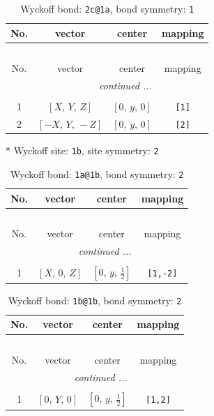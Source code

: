 \documentclass[fleqn,8pt]{jsarticle}
\begin{document}
\renewcommand{\arraystretch}{1.2}
\begin{longtable}{cccc}
\caption{Wyckoff bond: {\tt 2c@1a}, bond symmetry: {\tt 1}}
 \\
 \hline \hline
No. & vector & center & mapping \\ \hline \endfirsthead

\multicolumn{3}{l}{\tablename\ \thetable{}} \\
 \hline \hline
No. & vector & center & mapping \\ \hline \endhead

 \hline \hline
\multicolumn{3}{r}{\footnotesize\it continued ...} \\ \endfoot

 \hline \hline
\multicolumn{3}{r}{} \\ \endlastfoot

1 & $\left[ X,\, Y,\, Z \right]$ & $\left[ 0,\, y,\, 0 \right]$ & {\tt [1]} \\ \hline
2 & $\left[ - X,\, Y,\, - Z \right]$ & $\left[ 0,\, y,\, 0 \right]$ & {\tt [2]} \\
\end{longtable}
* Wyckoff site: {\tt 1b}, site symmetry: {\tt 2}
\renewcommand{\arraystretch}{1.2}
\begin{longtable}{cccc}
\caption{Wyckoff bond: {\tt 1a@1b}, bond symmetry: {\tt 2}}
 \\
 \hline \hline
No. & vector & center & mapping \\ \hline \endfirsthead

\multicolumn{3}{l}{\tablename\ \thetable{}} \\
 \hline \hline
No. & vector & center & mapping \\ \hline \endhead

 \hline \hline
\multicolumn{3}{r}{\footnotesize\it continued ...} \\ \endfoot

 \hline \hline
\multicolumn{3}{r}{} \\ \endlastfoot

1 & $\left[ X,\, 0,\, Z \right]$ & $\left[ 0,\, y,\, \frac{1}{2} \right]$ & {\tt [1,-2]} \\
\end{longtable}
\renewcommand{\arraystretch}{1.2}
\begin{longtable}{cccc}
\caption{Wyckoff bond: {\tt 1b@1b}, bond symmetry: {\tt 2}}
 \\
 \hline \hline
No. & vector & center & mapping \\ \hline \endfirsthead

\multicolumn{3}{l}{\tablename\ \thetable{}} \\
 \hline \hline
No. & vector & center & mapping \\ \hline \endhead

 \hline \hline
\multicolumn{3}{r}{\footnotesize\it continued ...} \\ \endfoot

 \hline \hline
\multicolumn{3}{r}{} \\ \endlastfoot

1 & $\left[ 0,\, Y,\, 0 \right]$ & $\left[ 0,\, y,\, \frac{1}{2} \right]$ & {\tt [1,2]} \\
\end{longtable}
\end{document}
